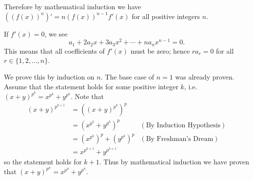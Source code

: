 \begin{questions}
    Therefore by mathematical induction we have $((f(x))^n)' = n(f(x))^{n-1}f'(x)$ for all positive integers $n$.

    \item If $f'(x) = 0$, we see
    \[
        a_1 + 2a_2x + 3a_3x^2 + \cdots + na_nx^{n-1} = 0.
    \]
    This means that all coefficients of $f'(x)$ must be zero; hence $ra_r = 0$ for all $r \in \{1, 2, \dots, n\}$.

    \item We prove this by induction on $n$. The base case of $n = 1$ was already proven. Assume that the statement holds for some positive integer $k$, i.e. $(x+y)^{p^k} = x^{p^k} + y^{p^k}$. Note that
    \begin{align*}
        (x+y)^{p^{k+1}} &= \left((x+y)^{p^k}\right)^p\\
        &= (x^{p^k}+y^{p^k})^p & (\text{By Induction Hypothesis})\\
        &= \left(x^{p^k}\right)^p + \left(y^{p^k}\right)^p & (\text{By Freshman's Dream})\\
        &= x^{p^{k+1}} + y^{p^{k+1}}
    \end{align*}
    so the statement holds for $k + 1$. Thus by mathematical induction we have proven that $(x+y)^{p^n} = x^{p^n} + y^{p^n}$.
\end{questions}

